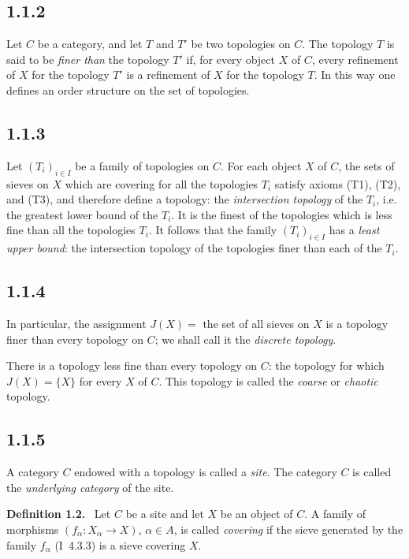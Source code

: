 \documentclass[11pt]{article}
\newenvironment{statement}[1]{\par\medskip\noindent\textbf{#1.}\ }{\par\medskip}
\begin{document}
\subsection*{1.1.2}
Let \(C\) be a category, and let \(T\) and \(T'\) be two topologies on \(C\). The topology \(T\) is said to be \emph{finer than} the topology \(T'\) if, for every object \(X\) of \(C\), every refinement of \(X\) for the topology \(T'\) is a refinement of \(X\) for the topology \(T\). In this way one defines an order structure on the set of topologies.

\subsection*{1.1.3}
Let \((T_i)_{i\in I}\) be a family of topologies on \(C\). For each object \(X\) of \(C\), the sets of sieves on \(X\) which are covering for all the topologies \(T_i\) satisfy axioms (T1), (T2), and (T3), and therefore define a topology: the \emph{intersection topology} of the \(T_i\), i.e. the greatest lower bound of the \(T_i\). It is the finest of the topologies which is less fine than all the topologies \(T_i\). It follows that the family \((T_i)_{i\in I}\) has a \emph{least upper bound}: the intersection topology of the topologies finer than each of the \(T_i\).

\subsection*{1.1.4}
In particular, the assignment \(J(X)=\) the set of all sieves on \(X\) is a topology finer than every topology on \(C\); we shall call it the \emph{discrete topology}.

There is a topology less fine than every topology on \(C\): the topology for which \(J(X)=\{X\}\) for every \(X\) of \(C\). This topology is called the \emph{coarse} or \emph{chaotic} topology.

\subsection*{1.1.5}
A category \(C\) endowed with a topology is called a \emph{site}. The category \(C\) is called the \emph{underlying category} of the site.

\begin{statement}{Definition 1.2}
Let \(C\) be a site and let \(X\) be an object of \(C\). A family of morphisms \((f_\alpha:X_\alpha\to X)\), \(\alpha\in A\), is called \emph{covering} if the sieve generated by the family \(f_\alpha\) (I~4.3.3) is a sieve covering \(X\).
\end{statement}
\end{document}
